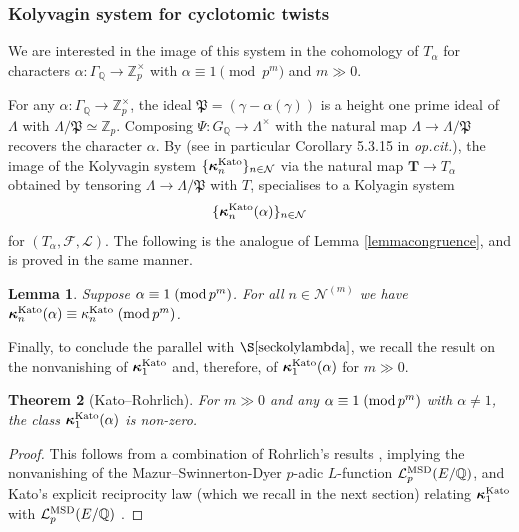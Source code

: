 \documentclass[10pt,reqno]{amsart}
\numberwithin{equation}{section}
\theoremstyle{plain}
\newtheorem{thm}{Theorem}[subsection] %
\theoremstyle{definition}
\theoremstyle{definition}
\theoremstyle{plain}
\theoremstyle{plain}
\newtheorem{lemma}[thm]{Lemma}
\theoremstyle{plain}
\theoremstyle{plain}
\theoremstyle{plain}
\theoremstyle{plain}
\newcommand{\Z}{\mathbb{Z}}
\newcommand{\Q}{\mathbb{Q}}
\newcommand{\F}{\mathcal{F}}
\newcommand{\p}{\mathfrak{P}}
\newcommand{\bkappa}{\boldsymbol{\kappa}}
\newcommand{\Fcal}{\mathcal{F}}
\newcommand{\rH}{\mathrm{H}}
\begin{document}
\subsubsection{Kolyvagin system for cyclotomic twists}

We are interested in the image of this system in the cohomology of $T_{\alpha}$ for characters $\alpha:\Gamma_\Q\to \Z_p^{\times}$ with $\alpha\equiv 1 \pmod{p^m}$ and $m\gg 0$.

For any $\alpha:\Gamma_\Q\rightarrow\Z_p^\times$, the ideal 
$\p = (\gamma-\alpha(\gamma))$ is a height one prime ideal of $\Lambda$ with $\Lambda/\p\simeq\Z_p$. Composing $\Psi:G_\Q\rightarrow\Lambda^\times$ with the natural map $\Lambda\rightarrow \Lambda/\p$ recovers the character $\alpha$. 
By \cite[$\S$5.3]{mazrub} (see in particular Corollary 5.3.15 in \emph{op.cit.}), the image of the Kolyvagin system $\{\bkappa_{n}^{\rm Kato}\}_{n\in\mathcal{N}}$ via the natural map $\mathbf{T}\to T_\alpha$ obtained by tensoring $\Lambda\rightarrow\Lambda/\p$ with $T$, specialises to a Kolyagin system
\[
\{\bkappa_{n}^{\rm Kato}(\alpha)\}_{n\in\mathcal{N}}
\]
for $(T_\alpha,\F,\mathcal{L})$. The following is the analogue of Lemma \ref{lemmacongruence}, and is proved in the same manner.

\begin{lemma}\label{lemmacongruence2}
Suppose $\alpha\equiv 1\;({\rm mod}\,p^m)$. For all $n\in\mathcal{N}^{(m)}$ we have $\bkappa_{n}^{\rm Kato}(\alpha)\equiv \kappa_n^{\rm Kato}\;({\rm mod}\,p^m)$. 
\end{lemma}
 
Finally, to conclude the parallel with $\S\ref{seckolylambda}$, we recall the result on the nonvanishing of $\bkappa_{1}^{\rm Kato}$ and, therefore, of $\bkappa_{1}^{\rm Kato}(\alpha)$ for $m\gg 0$. 

\begin{thm}[Kato--Rohrlich]\label{thm:kato-rohrlich}
For $m\gg 0$ and any $\alpha\equiv 1\;({\rm mod}\,p^m)$ with $\alpha \neq 1$, the class $\bkappa_{1}^{\rm Kato}(\alpha)$ is non-zero.
\end{thm}

\begin{proof}
This follows from a combination of Rohrlich's results \cite{rohrlich-cyc}, implying the nonvanishing of the Mazur--Swinnerton-Dyer $p$-adic $L$-function $\mathcal{L}_p^{\rm MSD}(E/\Q)$, and Kato's explicit reciprocity law \cite[Thm.~16.6]{kato-euler-systems} (which we recall in the next section) relating $\bkappa_{1}^{\rm Kato}$ with $\mathcal{L}_p^{\rm MSD}(E/\Q)$ .
\end{proof}
\end{document}
